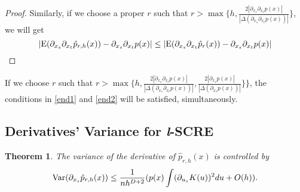 \documentclass[aos,preprint]{imsart}
\newtheorem{theorem}{Theorem}[section]
\theoremstyle{remark}
\begin{document}
\begin{appendix}
\begin{proof}
Similarly, if we choose a proper $r$ such that $r>\max\{h,\frac{2|\partial_{x_s}\partial_{x_t} p(x)|}{ |\Delta(\partial_{x_s} \partial_{x_t}p(x))|}\}$, we will get
\begin{equation}\label{end2}
|{\rm E}( \partial_{x_s} \partial_{x_t} \hat{p}_{r,h}(x)) - \partial_{x_s} \partial_{x_t} p(x)| \leq |{\rm E}( \partial_{x_s}  \partial_{x_t} \hat{p}_{r}(x)) -  \partial_{x_s }\partial_{x_t} p(x)|
\end{equation}
\end{proof}
If we choose $r$ such that $ r>\max\{h,\frac{2|\partial_{x_s}\partial_{x_t} p(x)|}{ |\Delta(\partial_{x_s} \partial_{x_t}p(x))|}, \frac{2|\partial_{x_s} p(x)|}{ |\Delta(\partial_{x_s} p(x))|}\}\}$, the conditions in \eqref{end1} and \eqref{end2} will be satisfied, simultaneously.
\subsection{Derivatives' Variance for {\it l}-SCRE}
\begin{theorem}{The variance of the derivative of $\hat{p}_{r,h}(x)$ is controlled by}
\[
{{\rm Var}}(\partial_{x_s} \hat{p}_{r,h}(x)) \leq \frac{1}{n h^{D+2}}  (p(x) \int (\partial_{ u_s } K (u) )^2   du + O(h)).
\]
\end{theorem}


\end{appendix}
\end{document}
